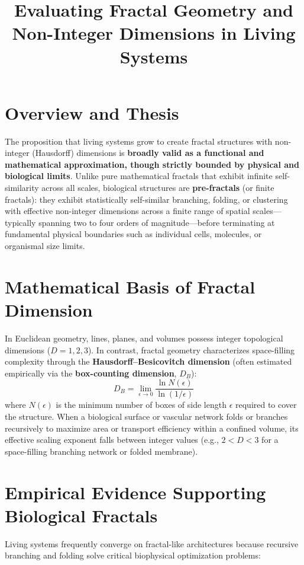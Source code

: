 \documentclass[11pt,a4paper]{article}
\title{Evaluating Fractal Geometry and Non-Integer Dimensions in Living Systems}
\author{}
\date{}
\begin{document}
\maketitle

\section{Overview and Thesis}
The proposition that living systems grow to create fractal structures with non-integer (Hausdorff) dimensions is \textbf{broadly valid as a functional and mathematical approximation, though strictly bounded by physical and biological limits}. Unlike pure mathematical fractals that exhibit infinite self-similarity across all scales, biological structures are \textbf{pre-fractals} (or finite fractals): they exhibit statistically self-similar branching, folding, or clustering with effective non-integer dimensions across a finite range of spatial scales—typically spanning two to four orders of magnitude—before terminating at fundamental physical boundaries such as individual cells, molecules, or organismal size limits.

\section{Mathematical Basis of Fractal Dimension}
In Euclidean geometry, lines, planes, and volumes possess integer topological dimensions ($D = 1, 2, 3$). In contrast, fractal geometry characterizes space-filling complexity through the \textbf{Hausdorff--Besicovitch dimension} (often estimated empirically via the \textbf{box-counting dimension}, $D_B$):
\begin{equation}
D_B = \lim_{\epsilon \to 0} \frac{\ln N(\epsilon)}{\ln(1/\epsilon)}
\end{equation}
where $N(\epsilon)$ is the minimum number of boxes of side length $\epsilon$ required to cover the structure. When a biological surface or vascular network folds or branches recursively to maximize area or transport efficiency within a confined volume, its effective scaling exponent falls between integer values (e.g., $2 < D < 3$ for a space-filling branching network or folded membrane).

\section{Empirical Evidence Supporting Biological Fractals}
Living systems frequently converge on fractal-like architectures because recursive branching and folding solve critical biophysical optimization problems:
\end{document}
